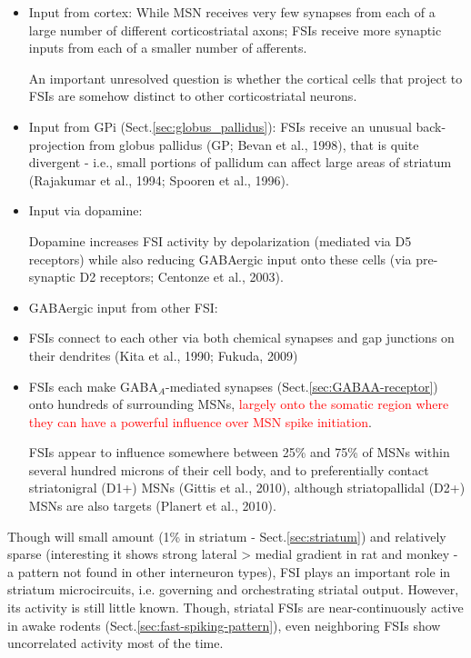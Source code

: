 \begin{itemize} 
  
  \item Input from cortex: While MSN receives very few synapses from each of a
  large number of different corticostriatal axons; FSIs receive more synaptic
  inputs from each of a smaller number of afferents.
  
  An important unresolved question is whether the cortical cells that project to
  FSIs are somehow distinct to other corticostriatal neurons.
  
  \item Input from GPi (Sect.\ref{sec:globus_pallidus}): FSIs receive an unusual
  back-projection from globus pallidus (GP; Bevan et al., 1998), that is quite
  divergent - i.e., small portions of pallidum can affect large areas of
  striatum (Rajakumar et al., 1994; Spooren et al., 1996).
  
  \item Input via dopamine:
  
  Dopamine increases FSI activity by depolarization (mediated via D5 receptors)
  while also reducing GABAergic input onto these cells (via pre-synaptic D2
  receptors; Centonze et al., 2003).
  
  \item GABAergic input from other FSI:
  
  
  \item FSIs connect to each other via both chemical synapses and gap junctions
  on their dendrites (Kita et al., 1990; Fukuda, 2009)
  
  \item FSIs each make GABA$_A$-mediated synapses
  (Sect.\ref{sec:GABAA-receptor}) onto hundreds of surrounding MSNs,
  \textcolor{red}{largely onto the somatic region where they can have a powerful influence over MSN spike initiation}.
  
  FSIs appear to influence somewhere between 25\% and 75\% of MSNs within
  several hundred microns of their cell body, and to preferentially contact
  striatonigral (D1+) MSNs (Gittis et al., 2010), although striatopallidal (D2+)
  MSNs are also targets (Planert et al., 2010).
\end{itemize}


Though will small amount (1\% in striatum - Sect.\ref{sec:striatum}) and
relatively sparse (interesting it shows strong lateral > medial gradient in rat
and monkey - a pattern not found in other interneuron types), FSI plays an
important role in striatum microcircuits, i.e.
governing and orchestrating striatal output.
However, its activity is still little known. Though, striatal FSIs are
near-continuously active in awake rodents (Sect.\ref{sec:fast-spiking-pattern}),
even neighboring FSIs show uncorrelated activity most of the time.

